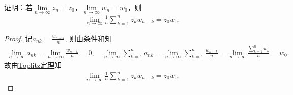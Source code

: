 \documentclass[../../main.tex]{subfiles}%
\begin{document}
\begin{example}
证明：若$\lim\limits_{n \to \infty} z_n = z_0$，$\lim\limits_{n \to \infty} w_n = w_0$，则
\begin{align*}
\lim\limits_{n \to \infty} \frac{1}{n} \sum\limits_{k=1}^n z_k w_{n - k} = z_0 w_0.
\end{align*}
\end{example}
\begin{proof}
记$a_{nk}=\frac{w_{n-k}}{n}$, 则由条件和知
\begin{align*}
\lim\limits_{n\rightarrow \infty}a_{nk}=\lim\limits_{n\rightarrow \infty}\frac{w_{n-k}}{n}=0,\quad \lim\limits_{n\rightarrow \infty}\sum_{k=1}^n{a_{nk}}=\lim\limits_{n\rightarrow \infty}\sum_{k=1}^n{\frac{w_{n-k}}{n}}=\lim\limits_{n\rightarrow \infty}\frac{\sum\limits_{k=1}^n{w_k}}{n}=w_0.
\end{align*}
故由\hyperref[theorem:复变版本-Toplitz定理]{Toplitz定理}知
\begin{align*}
\lim\limits_{n\rightarrow \infty} \frac{1}{n}\sum_{k=1}^n{z_kw_{n-k}}=z_0w_0.
\end{align*}
\end{proof}
\end{document}
